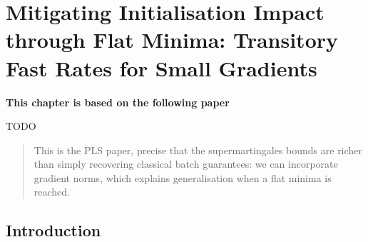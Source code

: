 \chapter[Mitigating Initialisation Impact through Flat Minima: Transitory Fast Rates for Small Gradients]{Mitigating Initialisation Impact through Flat Minima: Transitory Fast Rates for Small Gradients}
\label{chap:gen-flat-minima}
\addchapterlof
\addchapterloe

\vspace{-2.0cm}
\begin{center}
\textbf{This chapter is based on the following paper}\\[-0.1cm]
\end{center}
TODO


\vspace{0.2cm}
\minitoc

\begin{abstract}
\vspace{-0.2cm}
This is the PLS paper, precise that the supermartingales bounds are richer than simply recovering classical batch guarantees: we can incorporate gradient norms, which explains generalisation when a flat minima is reached.
\end{abstract}

\newpage
     
\section{Introduction}
